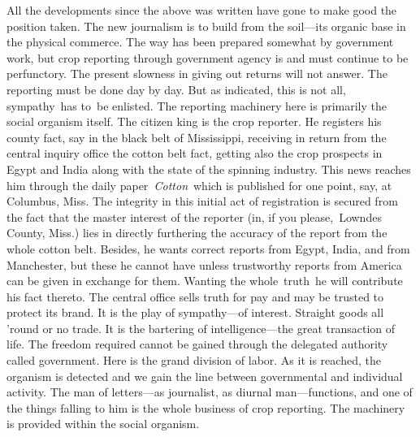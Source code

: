 \documentclass[twoside,symmetric,nobib,justified]{tufte-book}
\begin{document}
All the developments since the above was written have gone to make good
the position taken. The new journalism is to build from the soil---its
organic base in the physical commerce. The way has been prepared
somewhat by government work, but crop reporting through government
agency is and must continue to be perfunctory. The present slowness in
giving out returns will not answer. The reporting must be done day by
day. But as indicated, this is not all, sympathy~has to~be enlisted. The
reporting machinery here is primarily the social organism itself. The
citizen king is the crop reporter. He registers his county fact, say in
the black belt of Mississippi, receiving in return from the central
inquiry office the cotton belt fact, getting also the crop prospects in
Egypt and India along with the state of the spinning industry. This news
reaches him through the daily paper\emph{~Cotton}~which is published for
one point, say, at Columbus, Miss. The integrity in this initial act of
registration is secured from the fact that the master interest of the
reporter (in, if you please,~Lowndes County, Miss.) lies in directly
furthering the accuracy of the report from the whole cotton belt.
Besides, he wants correct reports from Egypt, India, and from
Manchester, but these he cannot have unless trustworthy reports from
America can be given in exchange for them. Wanting the whole~truth~he
will contribute his fact thereto. The central office sells truth for pay
and may be trusted to protect its brand. It is the play of sympathy---of
interest. Straight goods all 'round or no trade. It is the bartering of
intelligence---the great transaction of life. The freedom required
cannot be gained through the delegated authority called government. Here
is the grand division of labor. As it is reached, the organism is
detected and we gain the line between governmental and individual
activity. The man of letters---as journalist, as diurnal
man---functions, and one of the things falling to him is the whole
business of crop reporting. The machinery is provided within the social
organism.~

\enlargethispage{\baselineskip}
\end{document}
